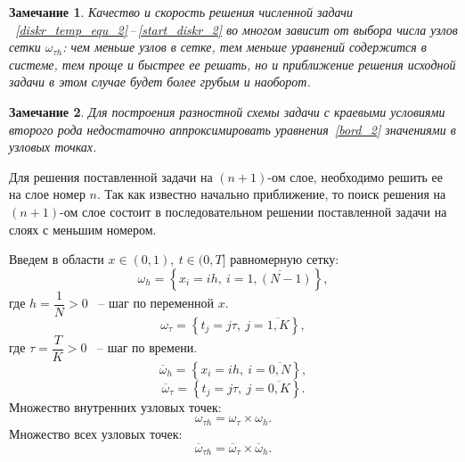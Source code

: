\documentclass[11pt,a4paper,twoside,listtotoc,bibtotoc]{report}
\numberwithin{equation}{section}
\theoremstyle{definition}
\theoremstyle{plain}
\newtheorem{note}{Замечание}[section]
\begin{document}
%
%
\begin{note}
%
    Качество и скорость решения численной задачи
   ~\eqref{diskr_temp_equ_2}\,--\,\eqref{start_diskr_2}
    во многом зависит от выбора числа узлов сетки $\omega_{\tau h}$:
    чем меньше узлов в сетке, тем меньше уравнений содержится в системе,
    тем проще и быстрее ее решать, но и приближение решения исходной задачи
    в этом случае будет более грубым и наоборот.
%
\end{note}
%





\begin{note}
%
    Для построения разностной схемы задачи с краевыми условиями второго рода
    недостаточно аппроксимировать уравнения~\eqref{bord_2} значениями в узловых
    точках.
%
\end{note}
%
%

Для решения поставленной задачи на $(n+1)$-ом слое, необходимо решить ее
на слое номер $n$. Так как известно начально приближение, то поиск решения на
$(n+1)$-ом слое состоит в последовательном решении поставленной задачи на слоях
с меньшим номером.

\fi



%
Введем в области $x \in (0,1),~t\in (0,T]$ равномерную сетку:
%
$$
    \omega_h = \left\{x_i = ih, ~i = \overline{1, (N - 1)}\right\},
$$
%
где $ h = \dfrac1N > 0$ ~-- шаг по переменной $x$.
%
$$
    \omega_{\tau} = \left\{t_j = j\tau , ~j = \overline{1, K}\right\},
$$
%
где $\tau = \dfrac{T}{K} > 0$ ~-- шаг по времени.
%
$$
    \overline{\omega}_h = \left\{x_i = ih,~i = \overline{0, N}\right\},
$$
%
$$
    \overline{\omega}_{\tau} = \left\{t_j = j\tau ,~j = \overline{0,K}\right\}.
$$
%
Множество внутренних узловых точек:
%
$$
    \omega_{\tau h} = \omega_\tau \times \omega_h.
$$
%
Множество всех узловых точек:
%
$$
    \overline{\omega}_{\tau h} = \overline{\omega}_\tau \times
    \overline{\omega}_h.
$$
%
\end{document}
